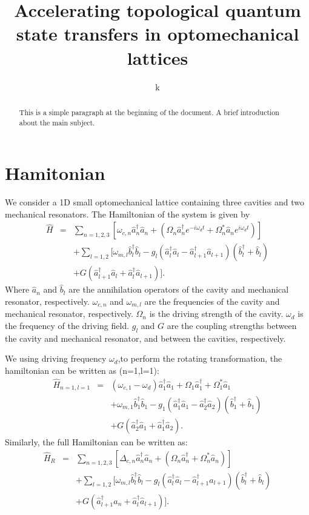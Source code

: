 \documentclass{article}
\title{Accelerating topological quantum state transfers in optomechanical lattices}
\author{k}
\begin{document}
\maketitle
\begin{abstract}
	This is a simple paragraph at the beginning of the 
	document. A brief introduction about the main subject.
\end{abstract}
\section{Hamitonian}
We consider a 1D small optomechanical lattice containing three cavities and two mechanical resonators. The Hamiltonian of the system is given by 
\begin{eqnarray}\label{eq1}
\hat{H} &=& \sum_{n=1,2,3}[\omega_{c,n}\hat a_n^{\dag}\hat a_n+(\Omega_n\hat a_n^{\dag}e^{-i\omega_{d}t}+\Omega_n^{\ast} \hat a_n e^{i\omega_{d}t})]\nonumber \\
&& +\sum_{l=1,2}[\omega_{m,l}\hat b_l^{\dag}\hat b_l-g_l(\hat a_l^{\dag}\hat a_l-\hat a_{l+1}^{\dag}\hat a_{l+1})(\hat b_l^{\dag}+\hat b_l)\nonumber\\
&&+G(\hat a_{l+1}^{\dag}\hat a_l+\hat a_l^{\dag}\hat a_{l+1})].
\end{eqnarray}
Where $\hat a_{n}$ and $\hat b_{l}$ are the annihilation operators of the cavity and mechanical resonator, respectively. $\omega_{c,n}$ and $\omega_{m,l}$ are the frequencies of the cavity and mechanical resonator, respectively. $\Omega_{n}$ is the driving strength of the cavity. $\omega_{d}$ is the frequency of the driving field. $g_{l}$ and $G$ are the coupling strengths between the cavity and mechanical resonator, and between the cavities, respectively.

We using driving frequency $\omega_{d}$,to perform the rotating transformation, the hamiltonian can be written as (n=1,l=1):
\begin{eqnarray}\label{eq2}
\hat{H}_{n=1,l=1}&=&(\omega_{c,1}-\omega_{d})\hat a_1^{\dag}\hat a_1+\Omega_1\hat a_1^{\dag}+\Omega_1^{\ast}\hat a_1\nonumber \\
&& +\omega_{m,1}\hat b_1^{\dag}\hat b_1-g_1(\hat a_1^{\dag}\hat a_1-\hat a_2^{\dag}\hat a_2)(\hat b_1^{\dag}+\hat b_1)\nonumber\\
&&+G(\hat a_2^{\dag}\hat a_1+\hat a_1^{\dag}\hat a_2).
\end{eqnarray}
Similarly, the full Hamiltonian can be written as:
\begin{eqnarray}\label{eq3}
\hat{H}_{R} &=& \sum_{n=1,2,3}[\Delta_{c,n}\hat a_n^{\dag}\hat a_n+(\Omega_n \hat a_n^{\dag}+\Omega_n^{\ast} \hat a_n)]\nonumber \\
&& +\sum_{l=1,2}[\omega_{m,l}\hat b_l^{\dag}\hat b_l-g_l(\hat a_l^{\dag}\hat a_l-\hat a_{l+1}^{\dag}\hat a_{l+1})(\hat b_{l}^{\dag}+\hat b_{l})\nonumber\\
&&+G(\hat a_{l+1}^{\dag}\hat a_n+\hat a_l^{\dag}\hat a_{l+1})].
\end{eqnarray}
\end{document}
